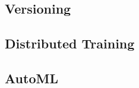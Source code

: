\subsection*{Versioning}



























































\subsection{Distributed Training}













\subsection{AutoML}




